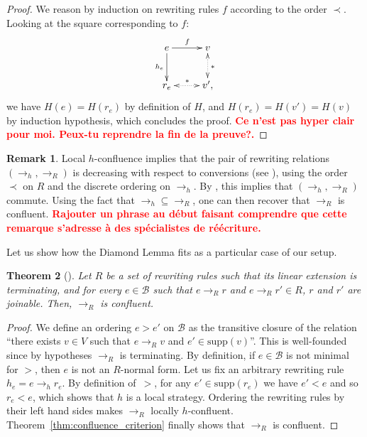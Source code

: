 \documentclass[10pt]{easychair}
\newtheorem{theorem}{Theorem}[section]
\theoremstyle{definition}
\newtheorem{remark}[theorem]{Remark}
\newcommand\todo[1]{{\bf\textcolor{red}{#1.}}}
\newcommand\supp{\text{supp}}
\newcommand\basis{\mathscr{B}}
\newcommand\rewR{\to_R}
\newcommand\rewh{\to_h}
\begin{document}
\begin{proof}
  We reason by induction on rewriting rules $f$ according to the order
  $\prec$. Looking at the square corresponding to $f$:
  \[
  \xymatrix @C = 2.5em @R = 2.5em{
    e 
    \ar [r] ^{f}
    \ar[d] _{h_e}
    &
    v
    \ar@{<.>} [d] ^{*}
    \\
    r_e
    \ar@{<.>} [r] ^{*}
    & 
    v',
  }
  \]
  we have $H(e)=H(r_e)$ by definition of $H$, and $H(r_e)=H(v')=H(v)$ by
  induction hypothesis, which concludes the proof.
  \todo{Ce n'est pas hyper clair pour moi. Peux-tu reprendre la fin de la
    preuve?}
\end{proof}
\medskip

\begin{remark}
  Local $h$-confluence implies that the pair of rewriting relations
  $(\rewh,\rewR)$ is decreasing with respect to conversions (see
  \cite[Definition 3]{van2008confluence}), using the order $\prec$ on $R$
  and the discrete ordering on $\rewh$. By
  \cite[Theorem 3]{van2008confluence}, this implies that $(\rewh,\rewR)$
  commute. Using the fact that $\rewh \subseteq \rewR$, one can then
  recover that $\rewR$ is confluent.
  \todo{Rajouter un phrase au début faisant comprendre que cette remarque
    s'adresse à des spécialistes de réécriture}
\end{remark}
\medskip

Let us show how the Diamond Lemma fits as a particular case of our setup.
\smallskip

\begin{theorem}[\cite{MR506890}]\label{thm:diamond_lemma}
  Let $R$ be a set of rewriting rules such that its linear extension is
  terminating, and for every $e\in\basis$ such that $e\rewR r$ and
  $e\rewR r'\in R$, $r$ and $r'$ are joinable. Then, $\rewR$ is
  confluent.
\end{theorem}

\begin{proof}
  We define an ordering $e>e'$ on $\basis$ as the transitive closure of
  the relation ``there exists $v\in V$ such that $e\rewR v$ and
  $e'\in\supp(v)$''. This is well-founded since by hypotheses $\rewR$ is
  terminating. By definition, if $e\in\basis$ is not minimal for $>$,
  then $e$ is not an $R$-normal form. Let us fix an arbitrary rewriting
  rule $h_e=e\rewh r_e$.  By definition of~$>$, for any $e'\in\supp(r_e)$
  we have $e'<e$ and so $r_e<e$, which shows that $h$ is a local
  strategy. Ordering the rewriting rules by their left hand sides makes
  $\rewR$ locally $h$-confluent. Theorem~\ref{thm:confluence_criterion}
  finally shows that $\rewR$ is confluent.   
\end{proof}
\end{document}
